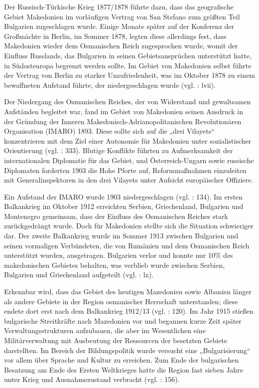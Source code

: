\par
Der Russisch-Türkische Krieg 1877/1878 führte dazu, dass das geografische Gebiet Makedonien im vorläufigen Vertrag von San Stefano zum größten Teil Bulgarien zugeschlagen wurde. Einige Monate später auf der Konferenz der Großmächte in Berlin, im Sommer 1878, legten diese allerdings fest, dass Makedonien wieder dem Osmanischen Reich zugesprochen wurde, womit der Einfluss Russlands, das Bulgarien in seinen Gebietsansprüchen unterstützt hatte, in Südosteuropa begrenzt werden sollte. Im Gebiet von Makedonien selbst führte der Vertrag von Berlin zu starker Unzufriedenheit, was im Oktober 1878 zu einem bewaffneten Aufstand führte, der niedergeschlagen wurde (vgl. \cite{bech09} :  lvii).\par
Der Niedergang des Osmanischen Reiches, der von Widerstand und gewaltsamen Aufständen begleitet war, fand im Gebiet von Makedonien seinen Ausdruck in der Gründung der Inneren Makedonisch-Adrianopolitanischen Revolutionären Organisation (IMARO) 1893. Diese sollte sich auf die „drei Vilayets“ konzentrieren mit dem Ziel einer Autonomie für Makedonien unter sozialistischer Orientierung (vgl. \cite{boeck} : 333). Blutige Konflikte führten zu Aufmerksamkeit der internationalen Diplomatie für das Gebiet, und Österreich-Ungarn sowie russische Diplomaten forderten 1903 die Hohe Pforte auf, Reformmaßnahmen einzuleiten mit Generalinspektoren in den drei Vilayets unter Aufsicht europäischer Offiziere.\par
 Ein Aufstand der IMARO wurde 1903 niedergeschlagen (vgl. \cite{tzermisa} : 134). Im ersten Balkankrieg im Oktober 1912 erreichten Serbien, Griechenland, Bulgarien und Montenegro gemeinsam, dass der Einfluss des Osmanischen Reiches stark zurückgedrängt wurde. Doch für Makedonien stellte sich die Situation schwieriger dar. Der zweite Balkankrieg wurde im Sommer 1913 zwischen Bulgarien und seinen vormaligen Verbündeten, die von Rumänien und dem Osmanischen Reich unterstützt wurden, ausgetragen. Bulgarien verlor und konnte nur 10\% des makedonischen Gebietes behalten, was verblieb wurde zwischen Serbien, Bulgarien und Griechenland aufgeteilt (vgl. \cite{bech09} : lx).\par
 Erkennbar wird, dass das Gebiet des heutigen Mazedonien sowie Albanien länger als andere Gebiete in der Region osmanischer Herrschaft unterstanden; diese endete dort erst nach dem Balkankrieg 1912/13 (vgl. \cite{batal98} : 120). Im Jahr 1915 stießen bulgarische Streitkräfte nach Mazedonien vor und begannen kurze Zeit später Verwaltungsstrukturen aufzubauen, die aber im Wesentlichen eine Militärverwaltung mit Ausbeutung der Ressourcen der besetzten Gebiete darstellten. Im Bereich der Bildungspolitik wurde versucht eine „Bulgarisierung“ vor allem über Sprache und Kultur zu erreichen. Zum Ende der bulgarischen Besatzung am Ende des Ersten Weltkrieges hatte die Region fast sieben Jahre unter Krieg und Ausnahmezustand verbracht (vgl. \cite{opfer} : 156).
